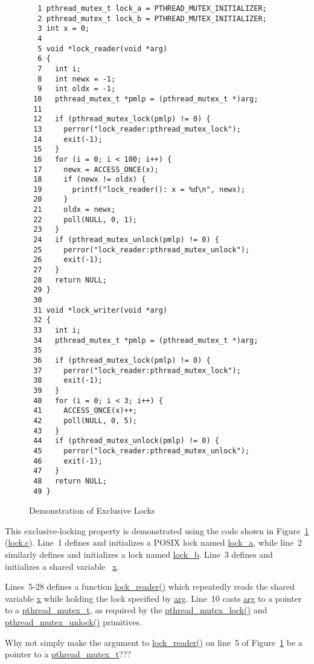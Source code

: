 \begin{figure}[tbp]
{ \scriptsize
\begin{verbatim}
  1 pthread_mutex_t lock_a = PTHREAD_MUTEX_INITIALIZER;
  2 pthread_mutex_t lock_b = PTHREAD_MUTEX_INITIALIZER;
  3 int x = 0;
  4 
  5 void *lock_reader(void *arg)
  6 {
  7   int i;
  8   int newx = -1;
  9   int oldx = -1;
 10   pthread_mutex_t *pmlp = (pthread_mutex_t *)arg;
 11 
 12   if (pthread_mutex_lock(pmlp) != 0) {
 13     perror("lock_reader:pthread_mutex_lock");
 14     exit(-1);
 15   }
 16   for (i = 0; i < 100; i++) {
 17     newx = ACCESS_ONCE(x);
 18     if (newx != oldx) {
 19       printf("lock_reader(): x = %d\n", newx);
 20     }
 21     oldx = newx;
 22     poll(NULL, 0, 1);
 23   }
 24   if (pthread_mutex_unlock(pmlp) != 0) {
 25     perror("lock_reader:pthread_mutex_unlock");
 26     exit(-1);
 27   }
 28   return NULL;
 29 }
 30 
 31 void *lock_writer(void *arg)
 32 {
 33   int i;
 34   pthread_mutex_t *pmlp = (pthread_mutex_t *)arg;
 35 
 36   if (pthread_mutex_lock(pmlp) != 0) {
 37     perror("lock_reader:pthread_mutex_lock");
 38     exit(-1);
 39   }
 40   for (i = 0; i < 3; i++) {
 41     ACCESS_ONCE(x)++;
 42     poll(NULL, 0, 5);
 43   }
 44   if (pthread_mutex_unlock(pmlp) != 0) {
 45     perror("lock_reader:pthread_mutex_unlock");
 46     exit(-1);
 47   }
 48   return NULL;
 49 }
\end{verbatim}
}
\caption{Demonstration of Exclusive Locks}
\label{fig:toolsoftrade:Demonstration of Exclusive Locks}
\end{figure}

This exclusive-locking property is demonstrated using the code shown in
Figure~\ref{fig:toolsoftrade:Demonstration of Exclusive Locks}
(\url{lock.c}).
Line~1 defines and initializes a POSIX lock named \url{lock_a}, while
line~2 similarly defines and initializes a lock named \url{lock_b}.
Line~3 defines and initializes a shared variable ~\url{x}.

Lines~5-28 defines a function \url{lock_reader()} which repeatedly
reads the shared variable \url{x} while holding
the lock specified by \url{arg}.
Line~10 casts \url{arg} to a pointer to a \url{pthread_mutex_t}, as
required by the \url{pthread_mutex_lock()} and \url{pthread_mutex_unlock()}
primitives.

\QuickQuiz{}
	Why not simply make the argument to \url{lock_reader()}
	on line~5 of
	Figure~\ref{fig:toolsoftrade:Demonstration of Exclusive Locks}
	be a pointer to a \url{pthread_mutex_t}???
 \QuickQuizEnd

